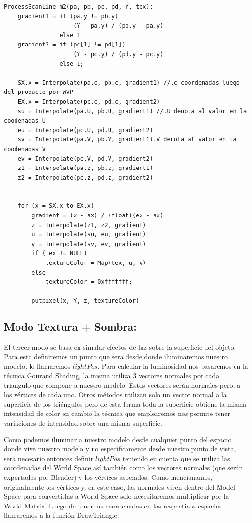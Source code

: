 \documentclass[a4paper]{article}
\newcounter{col}
\begin{document}
\begin{verbatim}
ProcessScanLine_m2(pa, pb, pc, pd, Y, tex):
    gradient1 = if (pa.y != pb.y) 
                    (Y - pa.y) / (pb.y - pa.y)
                else 1                          
    gradient2 = if (pc[1] != pd[1]) 
                    (Y - pc.y) / (pd.y - pc.y)
                else 1;
            
    SX.x = Interpolate(pa.c, pb.c, gradient1) //.c coordenadas luego del producto por WVP
    EX.x = Interpolate(pc.c, pd.c, gradient2)
    su = Interpolate(pa.U, pb.U, gradient1) //.U denota al valor en la coodenadas U
    eu = Interpolate(pc.U, pd.U, gradient2)
    sv = Interpolate(pa.V, pb.V, gradient1).V denota al valor en la coodenadas V
    ev = Interpolate(pc.V, pd.V, gradient2)
    z1 = Interpolate(pa.z, pb.z, gradient1)
    z2 = Interpolate(pc.z, pd.z, gradient2)
   

    for (x = SX.x to EX.x)
        gradient = (x - sx) / (float)(ex - sx)
        z = Interpolate(z1, z2, gradient)
        u = Interpolate(su, eu, gradient)
        v = Interpolate(sv, ev, gradient)
        if (tex != NULL)
            textureColor = Map(tex, u, v)
        else
            textureColor = 0xfffffff;
    
        putpixel(x, Y, z, textureColor)
\end{verbatim}

\subsection{Modo Textura + Sombra:} 

	El tercer modo se basa en simular efectos de luz sobre la superficie del objeto. Para esto definiremos un punto que sera desde donde iluminaremos nuestro modelo, lo llamaremos $lightPos$. Para calcular la luminosidad nos basaremos en la técnica Gouraud Shading, la misma utiliza 3 vectores normales por cada triangulo que compone a nuestro modelo. Estos vectores serán normales pero, a los vértices de cada uno. Otros métodos utilizan solo un vector normal a la superficie de los triángulos pero de esta forma toda la superficie obtiene la misma intensidad de color en cambio la técnica que emplearemos nos permite tener variaciones de intensidad sobre una misma superficie. 
\par Como podemos iluminar a nuestro modelo desde cualquier punto del espacio donde vive nuestro modelo y no específicamente desde nuestro punto de vista, sera necesario entonces definir $lightPos$ teniendo en cuenta que se utiliza las coordenadas del World Space así también como los vectores normales (que serán exportados por Blender) y los vértices asociados. Como mencionamos, originalmente los vértices y, en este caso, las normales viven dentro del Model Space para convertirlas a World Space solo necesitaremos multiplicar por la World Matrix.   Luego de tener las coordenadas en los respectivos espacios llamaremos a la función DrawTriangle.
\end{document}
